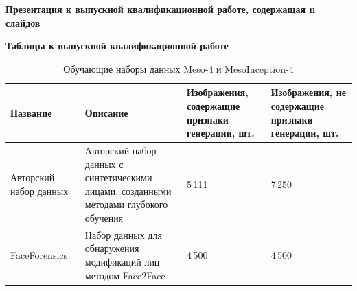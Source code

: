 
\textbf{Презентация к выпускной квалификационной работе, содержащая n слайдов}


\textbf{Таблицы к выпускной квалификационной работе}

\newpage

\setcounter{table}{0}
\renewcommand{\thetable}{Б.\arabic{table}}
\pagestyle{empty}


\begin{table}[h]
	\centering
	\caption{Обучающие наборы данных Meso-4 и MesoInception-4}
	\label{tbl:meso4-datasets}
	\begin{tabularx}{\textwidth}{|X|X|X|X|}
		\hline
		\textbf{Название} & \textbf{Описание} & \textbf{Изображения, содержащие признаки генерации, шт.} & \textbf{Изображения, не содержащие признаки генерации, шт.} \\
		\hline
		Авторский набор данных & Авторский набор данных с синтетическими лицами, созданными методами глубокого обучения & 5\,111 & 7\,250 \\
		\hline
		FaceForensics~\cite{faceforensics} & Набор данных для обнаружения модификаций лиц методом Face2Face & 4\,500 & 4\,500 \\
		\hline
	\end{tabularx}
\end{table}

